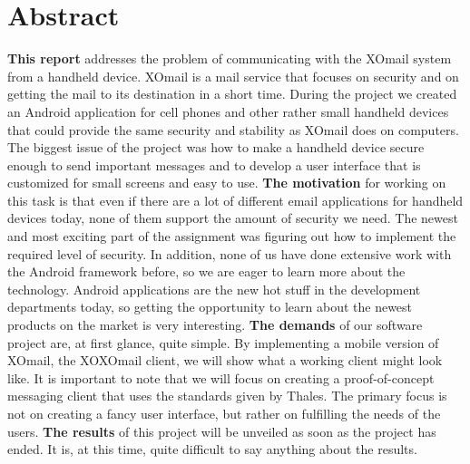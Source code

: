 
\chapter*{Abstract}

\textbf{This report} addresses the problem of communicating with the XOmail system from a handheld device. XOmail is a mail service that focuses on security and on getting the mail to its destination in a short time. During the project we created an Android application for cell phones and other rather small handheld devices that could provide the same security and stability as XOmail does on computers. The biggest issue of the project was how to make a handheld device secure enough to send important messages and to develop a user interface that is customized for small screens and easy to use. 
\newline
\newline
\textbf{The motivation} for working on this task is that even if there are a lot of different email applications for handheld devices today, none of them support the amount of security we need. The newest and most exciting part of the assignment was figuring out how to implement the required level of security. In addition, none of us have done extensive work with the Android framework before, so we are eager to learn more about the technology. Android applications are the new hot stuff in the development departments today, so getting the opportunity to learn about the newest products on the market is very interesting. 
\newline
\newline
\textbf{The demands} of our software project are, at first glance, quite simple. By implementing a mobile version of XOmail, the XOXOmail client, we will show what a working client might look like. It is important to note that we will focus on creating a proof-of-concept messaging client that uses the standards given by Thales. The primary focus is not on creating a fancy user interface, but rather on fulfilling the needs of the users. 
\newline
\newline
\textbf{The results} of this project will be unveiled as soon as the project has ended. It is, at this time, quite difficult to say anything about the results.

